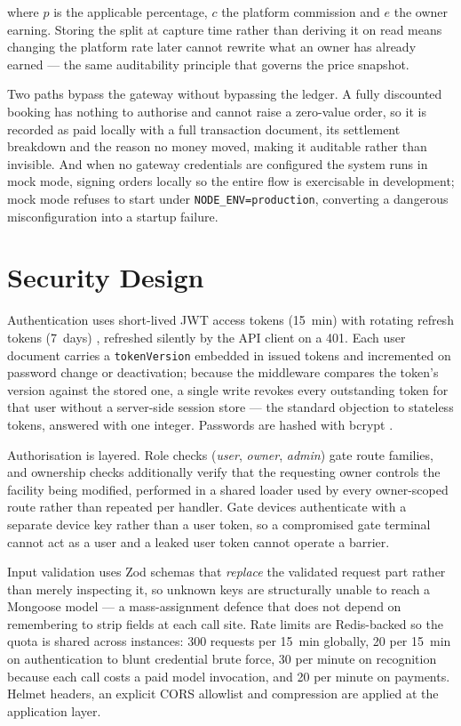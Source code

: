 \documentclass[journal,onecolumn,11pt]{IEEEtran}
\begin{document}
where $p$ is the applicable percentage, $c$ the platform commission and $e$ the
owner earning. Storing the split at capture time rather than deriving it on
read means changing the platform rate later cannot rewrite what an owner has
already earned --- the same auditability principle that governs the price
snapshot.

Two paths bypass the gateway without bypassing the ledger. A fully discounted
booking has nothing to authorise and cannot raise a zero-value order, so it is
recorded as paid locally with a full transaction document, its settlement
breakdown and the reason no money moved, making it auditable rather than
invisible. And when no gateway credentials are configured the system runs in
mock mode, signing orders locally so the entire flow is exercisable in
development; mock mode refuses to start under \texttt{NODE\_ENV=production},
converting a dangerous misconfiguration into a startup failure.

\section{Security Design}
\label{sec:security}

Authentication uses short-lived JWT access tokens (15~min) with rotating
refresh tokens (7~days) \cite{rfc7519}, refreshed silently by the API client on
a 401. Each user document carries a \texttt{tokenVersion} embedded in issued
tokens and incremented on password change or deactivation; because the
middleware compares the token's version against the stored one, a single write
revokes every outstanding token for that user without a server-side session
store --- the standard objection to stateless tokens, answered with one
integer. Passwords are hashed with bcrypt \cite{provos1999bcrypt}.

Authorisation is layered. Role checks (\textit{user}, \textit{owner},
\textit{admin}) gate route families, and ownership checks additionally verify
that the requesting owner controls the facility being modified, performed in a
shared loader used by every owner-scoped route rather than repeated per
handler. Gate devices authenticate with a separate device key rather than a
user token, so a compromised gate terminal cannot act as a user and a leaked
user token cannot operate a barrier.

Input validation uses Zod schemas that \emph{replace} the validated request
part rather than merely inspecting it, so unknown keys are structurally unable
to reach a Mongoose model --- a mass-assignment defence that does not depend on
remembering to strip fields at each call site. Rate limits are Redis-backed so
the quota is shared across instances: 300 requests per 15~min globally, 20 per
15~min on authentication to blunt credential brute force, 30 per minute on
recognition because each call costs a paid model invocation, and 20 per minute
on payments. Helmet headers, an explicit CORS allowlist and compression are
applied at the application layer.
\end{document}
